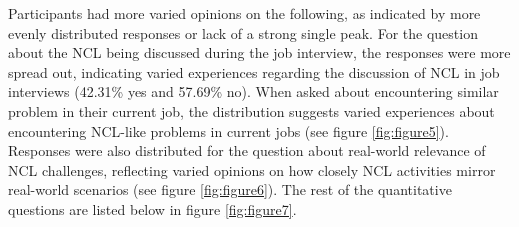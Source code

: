 \documentclass{article}
\begin{document}
\begin{figure}
\centering
\end{figure}

Participants had more varied opinions on the following, as indicated by more evenly distributed responses or lack of a strong single peak. For the question about the NCL being discussed during the job interview, the responses were more spread out, indicating varied experiences regarding the discussion of NCL in job interviews (42.31\% yes and 57.69\% no). When asked about encountering similar problem in their current job, the distribution suggests varied experiences about encountering NCL-like problems in current jobs (see figure \ref{fig:figure5}). Responses were also distributed for the question about real-world relevance of NCL challenges, reflecting varied opinions on how closely NCL activities mirror real-world scenarios (see figure \ref{fig:figure6}). The rest of the quantitative questions are listed below in figure \ref{fig:figure7}.
\end{document}
